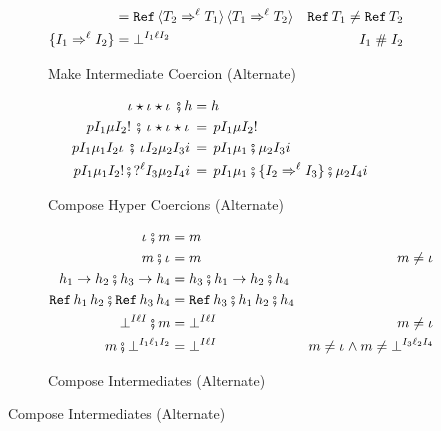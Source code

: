 \documentclass[acmtog, authorversion, acmlarge]{acmart}
\begin{document}
\begin{figure}[tbh]
\begin{subfigure}{.65\textwidth}
\begin{align*}
      &= \rf{\mkcrcn{\T_{2}}{\T_{1}}}{\mkcrcn{\T_{1}}{\T_{2}}} %
      & \Ref{\T_1} \neq \Ref{\T_2} \\
      \mkIcrcn{\I_1}{\I_2} &= \failed{\I_1}{\Lbl}{\I_2} %
      & \I_1 \sic \I_2
    \end{align*}
    \caption{Make Intermediate Coercion (Alternate)}
    \label{fig:makeIntCoercion}
  \end{subfigure}
  \begin{subfigure}{.5\textwidth}
    \begin{align*}
      \cmp{\hc{\pmt}{\Dyn}{\id}{\Dyn}{\imt}}{\HC} &= \HC \\
      \cmp{\hc{\Prj}{\I_1}{\Med}{\I_2}{\inj}} %
          {\hc{\pmt}{\Dyn}{\id}{\Dyn}{\imt}} %
      &=  \hc{\Prj}{\I_1}{\Med}{\I_2}{\inj} \\
      \cmp{\hc{\Prj}{\I_1}{\Med_1}{\I_2}{\imt}} %
          {\hc{\pmt}{\I_2}{\Med_2}{\I_3}{\Inj}} %
      &=  \hc{\Prj}{\I_1}{\cmpm{\Med_1}{\Med_2}}{\I_3}{\Inj} \\
      \cmp{\hc{\Prj}{\I_1}{\Med_1}{\I_2}{\inj}} %
          {\hc{\prj{\Lbl}}{\I_3}{\Med_2}{\I_4}{\Inj}} %
      &=  \hc{\Prj}{\I_1}{\cmpm{\cmpm{\Med_1}{\mkIcrcn{\I_2}{\I_3}}}{\Med_2}}{\I_4}{\Inj} %
    \end{align*}
    \caption{Compose Hyper Coercions (Alternate)}
    \label{fig:composeHC}
  \end{subfigure}%
  \begin{subfigure}{.5\textwidth}
    \begin{align*}
      \cmpm{\id}{m} &= m\\
      \cmpm{m}{\id} &= m & m \neq \id \\
      \cmpm{\fn{\HC_1}{\HC_2}}{\fn{\HC_3}{\HC_4}} %
      &= \fn{\cmp{\HC_3}{\HC_1}}{\cmp{\HC_2}{\HC_4}}\\
      \cmpm{\rf{\HC_1}{\HC_2}}{\rf{\HC_3}{\HC_4}} %
      &= \rf{\cmp{\HC_3}{\HC_1}}{\cmp{\HC_2}{\HC_4}}\\
      \cmpm{\failed{\I}{\Lbl}{\I}}{m} &= \failed{\I}{\Lbl}{\I} %
      & m \neq \id \\
      \cmpm{m}{\failed{\I_1}{\Lbl_1}{\I_2}} &= \failed{\I}{\Lbl}{\I} %
      & m \neq \id \wedge m \neq \failed{\I_3}{\Lbl_2}{\I_4}
    \end{align*}
    \caption{Compose Intermediates (Alternate)}
    \label{fig:composeMed}
  \end{subfigure}


\end{figure}



\end{document}
